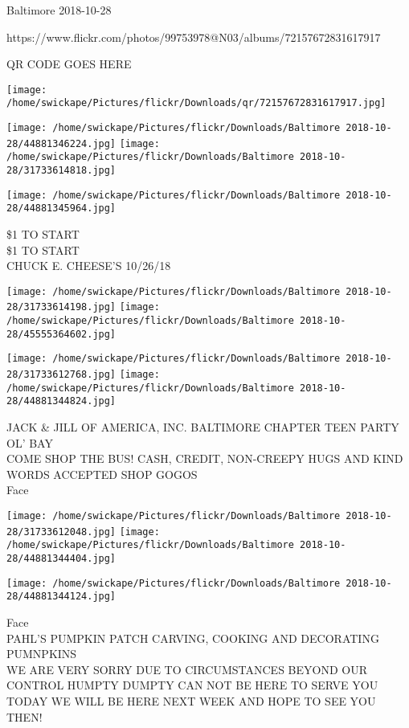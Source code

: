 \documentclass[10pt,letterpaper]{article}
\begin{document}
Baltimore 2018-10-28

https://www.flickr.com/photos/99753978@N03/albums/72157672831617917

QR CODE GOES HERE

\texttt{[image: /home/swickape/Pictures/flickr/Downloads/qr/72157672831617917.jpg]}
\pagebreak

\texttt{[image: /home/swickape/Pictures/flickr/Downloads/Baltimore 2018-10-28/44881346224.jpg]}
\texttt{[image: /home/swickape/Pictures/flickr/Downloads/Baltimore 2018-10-28/31733614818.jpg]}

\vspace{0.25in}
\texttt{[image: /home/swickape/Pictures/flickr/Downloads/Baltimore 2018-10-28/44881345964.jpg]}

\$1 TO START\\
\$1 TO START\\
CHUCK E. CHEESE'S 10/26/18\\
\pagebreak

\texttt{[image: /home/swickape/Pictures/flickr/Downloads/Baltimore 2018-10-28/31733614198.jpg]}
\texttt{[image: /home/swickape/Pictures/flickr/Downloads/Baltimore 2018-10-28/45555364602.jpg]}

\texttt{[image: /home/swickape/Pictures/flickr/Downloads/Baltimore 2018-10-28/31733612768.jpg]}
\texttt{[image: /home/swickape/Pictures/flickr/Downloads/Baltimore 2018-10-28/44881344824.jpg]}

JACK \& JILL OF AMERICA, INC. BALTIMORE CHAPTER TEEN PARTY\\
OL' BAY\\
COME SHOP THE BUS!  CASH, CREDIT, NON{-}CREEPY HUGS AND KIND WORDS ACCEPTED SHOP GOGOS\\
Face\\
\pagebreak

\texttt{[image: /home/swickape/Pictures/flickr/Downloads/Baltimore 2018-10-28/31733612048.jpg]}
\texttt{[image: /home/swickape/Pictures/flickr/Downloads/Baltimore 2018-10-28/44881344404.jpg]}

\texttt{[image: /home/swickape/Pictures/flickr/Downloads/Baltimore 2018-10-28/44881344124.jpg]}

Face\\
PAHL'S PUMPKIN PATCH CARVING, COOKING AND DECORATING PUMNPKINS\\
WE ARE VERY SORRY DUE TO CIRCUMSTANCES BEYOND OUR CONTROL HUMPTY DUMPTY CAN NOT BE HERE TO SERVE YOU TODAY WE WILL BE HERE NEXT WEEK AND HOPE TO SEE YOU THEN!\\
\pagebreak
\end{document}
